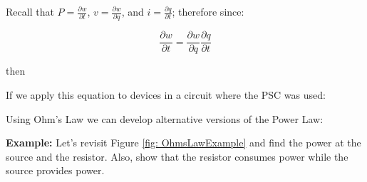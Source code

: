 \documentclass{handout}
\begin{document}
Recall that $P = \frac{\partial w}{\partial t}$,  $v = \frac{\partial w}{\partial q}$, and $i = \frac{\partial q}{\partial t}$; therefore since:

\begin{equation}
 \frac{\partial w}{\partial t} =  \frac{\partial w}{\partial q} \frac{\partial q}{\partial t}
\end{equation}

then


If we apply this equation to devices in a circuit where the PSC was used:


Using Ohm's Law we can develop alternative versions of the Power Law:



\textbf{Example:} Let's revisit Figure \ref{fig: OhmsLawExample} and find the power at the source and the resistor.  Also, show that the resistor consumes power while the source provides power.
\end{document}

